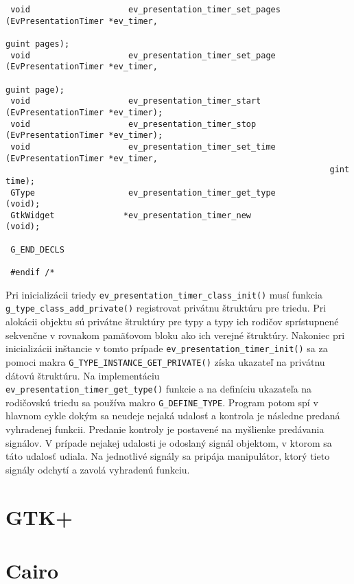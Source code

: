 \documentclass[12pt,oneside,final]{fithesis2}
\begin{document}
\begin{tiny}
\begin{verbatim}
 void                    ev_presentation_timer_set_pages         (EvPresentationTimer *ev_timer,
                                                                  guint pages);
 void                    ev_presentation_timer_set_page          (EvPresentationTimer *ev_timer,
                                                                  guint page);
 void                    ev_presentation_timer_start             (EvPresentationTimer *ev_timer);
 void                    ev_presentation_timer_stop              (EvPresentationTimer *ev_timer);
 void                    ev_presentation_timer_set_time          (EvPresentationTimer *ev_timer,
                                                                  gint time);
 GType                   ev_presentation_timer_get_type          (void);
 GtkWidget              *ev_presentation_timer_new               (void);
 
 G_END_DECLS
 
 #endif /*
\end{verbatim}
\end{tiny} %
Pri inicializácii triedy \verb|ev_presentation_timer_class_init()| musí funkcia \verb|g_type_class_add_private()| registrovat privátnu štruktúru pre triedu. Pri alokácii objektu sú privátne štruktúry pre typy a typy ich rodičov sprístupnené sekvenčne v rovnakom pamäťovom bloku ako ich verejné štruktúry. Nakoniec pri inicializácii inštancie v tomto prípade \verb|ev_presentation_timer_init()| sa za pomoci makra \verb|G_TYPE_INSTANCE_GET_PRIVATE()| získa ukazateľ na privátnu dátovú štruktúru. Na implementáciu \\
\verb|ev_presentation_timer_get_type()| funkcie a na definíciu ukazateľa na rodičovskú triedu sa používa makro \verb|G_DEFINE_TYPE|.
Program potom spí v hlavnom cykle dokým sa neudeje nejaká udalosť a kontrola je následne predaná vyhradenej funkcii. Predanie kontroly je postavené na myšlienke predávania signálov. V prípade nejakej udalosti je odoslaný signál objektom, v ktorom sa táto udalosť udiala. Na jednotlivé signály sa pripája manipulátor, ktorý tieto signály odchytí a zavolá vyhradenú funkciu. 
\section{GTK+}
\section{Cairo}
\end{document}
